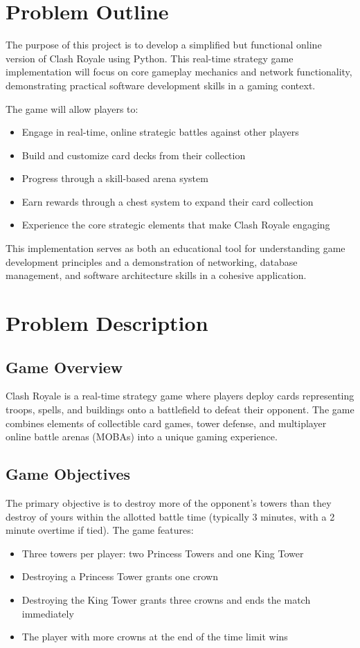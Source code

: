 \documentclass{article}
\begin{document}
\section{Problem Outline}

The purpose of this project is to develop a simplified but functional online version of Clash Royale using Python. This real-time strategy game implementation will focus on core gameplay mechanics and network functionality, demonstrating practical software development skills in a gaming context.

\noindent The game will allow players to:
\begin{itemize}
    \item Engage in real-time, online strategic battles against other players
    \item Build and customize card decks from their collection
    \item Progress through a skill-based arena system
    \item Earn rewards through a chest system to expand their card collection
    \item Experience the core strategic elements that make Clash Royale engaging
\end{itemize}

\noindent This implementation serves as both an educational tool for understanding game development principles and a demonstration of networking, database management, and software architecture skills in a cohesive application.

\section{Problem Description}

\subsection{Game Overview}
Clash Royale is a real-time strategy game where players deploy cards representing troops, spells, and buildings onto a battlefield to defeat their opponent. The game combines elements of collectible card games, tower defense, and multiplayer online battle arenas (MOBAs) into a unique gaming experience.

\subsection{Game Objectives}
The primary objective is to destroy more of the opponent's towers than they destroy of yours within the allotted battle time (typically 3 minutes, with a 2 minute overtime if tied). The game features:
\begin{itemize}
    \item Three towers per player: two Princess Towers and one King Tower
    \item Destroying a Princess Tower grants one crown
    \item Destroying the King Tower grants three crowns and ends the match immediately
    \item The player with more crowns at the end of the time limit wins
\end{itemize}
\end{document}
